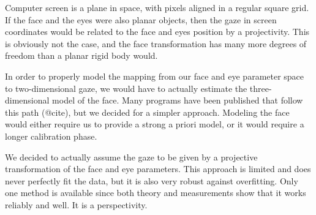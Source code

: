 Computer screen is a plane in space, with pixels aligned in a regular square grid.
If the face and the eyes were also planar objects, then the gaze in screen coordinates would be related to the face and eyes position by a projectivity.
This is obviously not the case, and the face transformation has many more degrees of freedom than a planar rigid body would.
 
In order to properly model the mapping from our face and eye parameter space to two-dimensional gaze, we would have to actually estimate the three-dimensional model of the face.
Many programs have been published that follow this path (@cite), but we decided for a simpler approach.
Modeling the face would either require us to provide a strong a priori model, or it would require a longer calibration phase.

We decided to actually assume the gaze to be given by a projective transformation of the face and eye parameters.
This approach is limited and does never perfectly fit the data, but it is also very robust against overfitting. 
Only one method is available since both theory and measurements show that it works reliably and well.
It is a perspectivity.
\todo{\dots}
